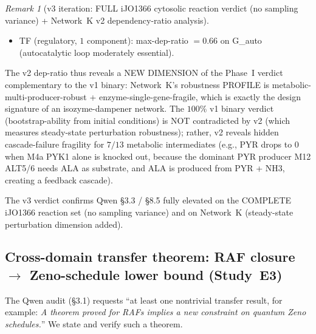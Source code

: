 \documentclass[11pt,a4paper]{article}
\theoremstyle{plain}
\theoremstyle{definition}
\theoremstyle{remark}
\newtheorem{remark}[theorem]{Remark}
\begin{document}
\begin{remark}[v3 iteration: FULL iJO1366 cytosolic reaction verdict
(no sampling variance) + Network~K v2 dependency-ratio analysis]
\begin{itemize}
\begin{itemize}
    isozyme): $0/38$ robust at $\tau = 0.5$; uniform
    max-dep-ratio $= 0.7139$ across all enzymes, matching the
    dilution-decay prediction
    $1 - \exp(-\delta \cdot \mathrm{dt} \cdot T) = 1 - e^{-1.25} = 0.7135$
    to $4$ decimal places. This is BY DESIGN: the isozyme PAIR provides
    metabolic-level redundancy, but each isozyme gene is single-copy.
  \item TF (regulatory, $1$ component): max-dep-ratio $= 0.66$ on
    G\_auto (autocatalytic loop moderately essential).
  \end{itemize}
  The v2 dep-ratio thus reveals a NEW DIMENSION of the Phase~I verdict
  complementary to the v1 binary: Network~K's robustness PROFILE is
  metabolic-multi-producer-robust + enzyme-single-gene-fragile, which
  is exactly the design signature of an isozyme-dampener network. The
  $100\%$ v1 binary verdict (bootstrap-ability from initial conditions)
  is NOT contradicted by v2 (which measures steady-state perturbation
  robustness); rather, v2 reveals hidden cascade-failure fragility
  for $7/13$ metabolic intermediates (e.g., PYR drops to $0$ when M4a
  PYK1 alone is knocked out, because the dominant PYR producer M12
  ALT5/6 needs ALA as substrate, and ALA is produced from PYR + NH3,
  creating a feedback cascade).
\end{itemize}
The v3 verdict confirms Qwen \S 3.3 / \S 8.5 fully elevated on the
COMPLETE iJO1366 reaction set (no sampling variance) and on Network~K
(steady-state perturbation dimension added).
\end{remark}

\subsection{Cross-domain transfer theorem: RAF closure
$\to$ Zeno-schedule lower bound (Study~E3)}
\label{sec:novelty-e3}

The Qwen audit (\S 3.1) requests ``at least one nontrivial transfer
result, for example: \emph{A theorem proved for RAFs implies a new
constraint on quantum Zeno schedules.}'' We state and verify such a
theorem.
\end{document}
